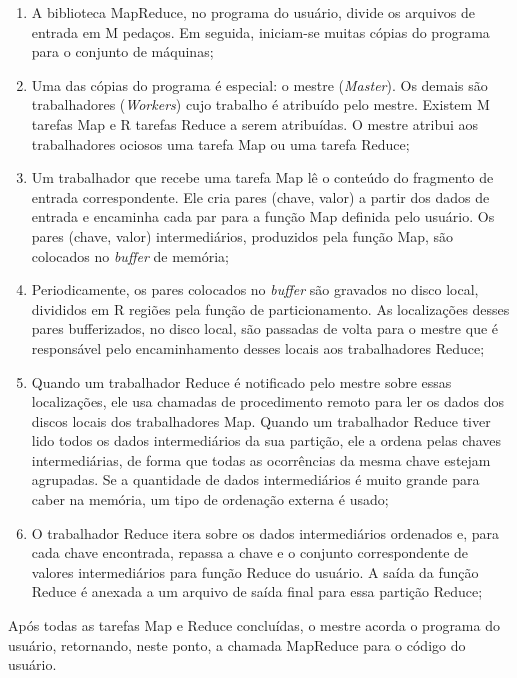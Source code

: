 \begin{enumerate}
\item A biblioteca MapReduce, no programa do usuário, divide os arquivos de entrada em M pedaços. Em seguida, iniciam-se muitas cópias do programa para o conjunto de máquinas;

\item Uma das cópias do programa é especial: o mestre (\textit{Master}). Os demais são trabalhadores (\textit{Workers}) cujo trabalho é atribuído pelo mestre. Existem M tarefas Map e R tarefas Reduce a serem atribuídas. O mestre atribui aos trabalhadores ociosos uma tarefa Map ou uma tarefa Reduce;

\item Um trabalhador que recebe uma tarefa Map lê o conteúdo do fragmento de entrada correspondente. Ele cria pares (chave, valor) a partir dos dados de entrada e encaminha cada par para a função Map definida pelo usuário. Os pares (chave, valor) intermediários, produzidos pela função Map, são colocados no \textit{buffer} de memória;

\item Periodicamente, os pares colocados no \textit{buffer} são gravados no disco local, divididos em R regiões  pela função de particionamento. As localizações desses pares bufferizados, no disco local, são passadas de volta para o mestre que é responsável pelo encaminhamento desses locais aos trabalhadores Reduce;

\item Quando um trabalhador Reduce é notificado pelo mestre sobre essas localizações, ele usa chamadas de procedimento remoto para ler os dados dos discos locais dos trabalhadores Map. Quando um trabalhador Reduce tiver lido todos os dados intermediários da sua partição, ele a ordena pelas chaves intermediárias, de forma que todas as ocorrências da mesma chave estejam agrupadas. Se a quantidade de dados intermediários é muito grande para caber na memória, um tipo de ordenação externa é usado;

\item O trabalhador Reduce itera sobre os dados intermediários ordenados e, para cada chave encontrada, repassa a chave e o conjunto correspondente de valores intermediários para função Reduce do usuário. A saída da função Reduce é anexada a um arquivo de saída final para essa partição Reduce;

             	        	
\end{enumerate}

Após todas as tarefas Map e Reduce concluídas, o mestre acorda o programa do usuário, retornando, neste ponto, a chamada MapReduce para o código do usuário.

